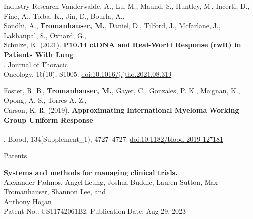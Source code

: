 \documentclass{resume} %
\begin{document}
\begin{grouping}{Industry Research}
\hspace*{1mm}Vanderwalde, A., Lu, M., Maund, S., Huntley, M., Incerti, D., Fine, A., Tolba, K., Jin, D., Bourla, A., \\
\hspace*{2mm}Sondhi, A., {\bf Tromanhauser, M.}, Daniel, D., Tilford, J., Mcfarlane, J., Lakhanpal, S., Oxnard, G., \\
\hspace*{2mm}Schulze, K. (2021). {\bf P10.14 ctDNA and Real-World Response (rwR) in Patients With Lung} \\
\hspace*{2mm}{\bf Cancer From A Prospective Real-World Clinico-Genomic (PCG) Study}. Journal of Thoracic \\
\hspace*{2mm}Oncology, 16(10), S1005. \href{https://doi.org/10.1016/j.jtho.2021.08.319}{doi:10.1016/j.jtho.2021.08.319}

\hspace*{1mm}Foster, R. B., {\bf Tromanhauser, M.}, Gayer, C., Gonzales, P. K., Maignan, K., Opong, A. S., Torres A. Z., \\
\hspace*{2mm}Carson, K. R. (2019). {\bf Approximating International Myeloma Working Group Uniform Response} \\
\hspace*{2mm}{\bf Criteria to Derive Response for Multiple Myeloma (MM) Patients Using Data from Electronic} \\
\hspace*{2mm}{\bf Health Records (EHR)}. Blood, 134(Supplement\_1), 4727–4727. \href{https://doi.org/10.1182/blood-2019-127181}{doi:10.1182/blood-2019-127181}
\fi

\end{grouping}

\begin{grouping}{Patents}

\item {\bf Systems and methods for managing clinical trials.} \\
    Alexander Padmos, Angel Leung, Joshua Buddle, Lauren Sutton, Max Tromanhauser, Shannon
    Lee, and \\ Anthony Hogan \\
    {Patent No.: US11742061B2. Publication Date: Aug 29, 2023}

\end{grouping}
\end{document}
